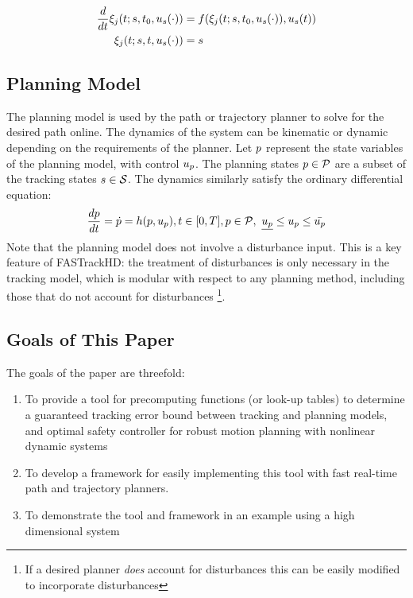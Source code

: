 \begin{equation}
\label{eq:fdyn_traj}
\begin{aligned}
\frac{d}{dt}\xi_{j}(t; s, t_0, u_s(\cdot)) &= f(\xi_{j}(t; s, t_0, u_s(\cdot)), u_s(t)) \\
\xi_{j}(t; s, t, u_s(\cdot)) &= s
\end{aligned}
\end{equation}

\subsection{Planning Model}
The planning model is used by the path or trajectory planner to solve for the desired path online. The dynamics of the system can be kinematic or dynamic depending on the requirements of the planner. Let $p$ represent the state variables of the planning model, with control $u_p$. The planning states $p \in \mathcal{P}$ are a subset of the tracking states $s \in \mathcal{S}$. The dynamics similarly satisfy the ordinary differential equation:
\begin{equation}
\begin{aligned}
\label{eq:pdyn}
\frac{dp}{dt} = \dot{p} = h(p, u_p), t \in [0, T], p \in \mathcal{P}, \ \underline{u_p} \leq u_p \leq \bar{u_p}
\end{aligned}
\end{equation}
Note that the planning model does not involve a disturbance input. This is a key feature of FASTrackHD: the treatment of disturbances is only necessary in the tracking model, which is modular with respect to any planning method, including those that do not account for disturbances \footnote{If a desired planner \textit{does} account for disturbances this can be easily modified to incorporate disturbances}.

\subsection{Goals of This Paper}
The goals of the paper are threefold:
\begin{enumerate}
	\item To provide a tool for precomputing functions (or look-up tables) to determine a guaranteed tracking error bound between tracking and planning models, and optimal safety controller for robust motion planning with nonlinear dynamic systems
	\item To develop a framework for easily implementing this tool with fast real-time path and trajectory planners.
	\item To demonstrate the tool and framework in an example using a high dimensional system
\end{enumerate}
